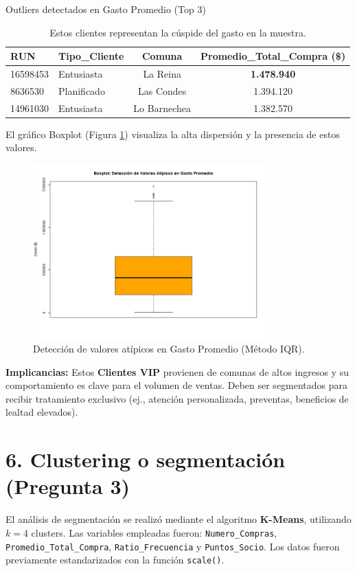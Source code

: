 \documentclass[12pt,a4paper]{article}
\begin{document}
\begin{table}[H]
    \centering
    \caption{Outliers detectados en Gasto Promedio (Top 3)}
    \label{tab:outliers}
    \begin{tabular}{l l c c}
    \toprule
    \textbf{RUN} & \textbf{Tipo\_Cliente} & \textbf{Comuna} & \textbf{Promedio\_Total\_Compra (\$)} \\
    \midrule
    16598453 & Entusiasta & La Reina & \textbf{1.478.940} \\
    8636530 & Planificado & Las Condes & 1.394.120 \\
    14961030 & Entusiasta & Lo Barnechea & 1.382.570 \\
    \bottomrule
    \end{tabular}
    \caption*{Estos clientes representan la cúspide del gasto en la muestra.}
\end{table}

El gráfico Boxplot (Figura \ref{fig:outliers}) visualiza la alta dispersión y la presencia de estos valores.

\begin{figure}[H]
    \centering
    \includegraphics[width=0.8\textwidth]{grafico_outliers.png}
    \caption{Detección de valores atípicos en Gasto Promedio (Método IQR).}
    \label{fig:outliers}
\end{figure}

\textbf{Implicancias:} Estos \textbf{Clientes VIP} provienen de comunas de altos ingresos y su comportamiento es clave para el volumen de ventas. Deben ser segmentados para recibir tratamiento exclusivo (ej., atención personalizada, preventas, beneficios de lealtad elevados).

\section*{6. Clustering o segmentación (Pregunta 3)}
El análisis de segmentación se realizó mediante el algoritmo \textbf{K-Means}, utilizando \textbf{$k=4$} clusters. Las variables empleadas fueron: \texttt{Numero\_Compras}, \texttt{Promedio\_Total\_Compra}, \texttt{Ratio\_Frecuencia} y \texttt{Puntos\_Socio}. Los datos fueron previamente estandarizados con la función \texttt{scale()}.
\end{document}
